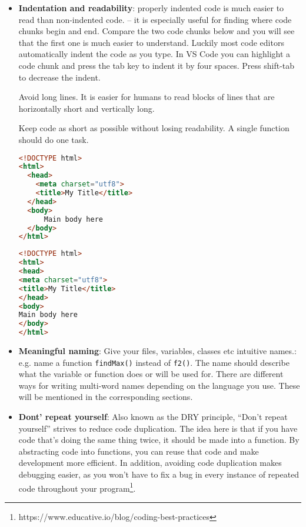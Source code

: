 \documentclass[11pt,a4paper]{report}
\newcommand{\bfb}[1]{{\bf \color{blue} #1}}
\begin{document}
\begin{itemize}
\item \bfb{Indentation and readability}: properly indented code is much easier to read than non-indented code. -- it is especially useful for finding where code chunks begin and end. Compare the two code chunks below and you will see that the first one is much easier to understand. Luckily most code editors automatically indent the code as you type.  In VS Code you can highlight a code chunk and press the tab key to indent it by four spaces. Press shift-tab to decrease the indent.

Avoid long lines. It is easier for humans to read blocks of lines that are horizontally short and vertically long. 

Keep code as short as possible without losing readability. A single function should do one task.

\newpage
\begin{multicols}{2}
\begin{lstlisting}[language=html]
<!DOCTYPE html>
<html>
  <head>
    <meta charset="utf8">
    <title>My Title</title>
  </head>
  <body>
      Main body here
  </body>
</html>
\end{lstlisting}

\begin{lstlisting}[language=html]
<!DOCTYPE html>
<html>
<head>
<meta charset="utf8">
<title>My Title</title>
</head>
<body>
Main body here
</body>
</html>
\end{lstlisting}
\end{multicols}

\item \bfb{Meaningful naming}: Give your files, variables, classes etc intuitive names.: e.g.  name a function \verb|findMax()| instead of \verb|f2()|. The name should describe what the variable or function does or will be used for. There are different ways for writing multi-word names depending on the language you use. These will be mentioned in the corresponding sections.

\item \bfb{Dont' repeat yourself}: Also known as the DRY principle, “Don’t repeat yourself” strives to reduce code duplication. The idea here is that if you have code that’s doing the same thing twice, it should be made into a function. By abstracting code into functions, you can reuse that code and make development more efficient. In addition, avoiding code duplication makes debugging easier, as you won’t have to fix a bug in every instance of repeated code throughout your program\footnote{https://www.educative.io/blog/coding-best-practices}.


\end{itemize}
\end{document}
